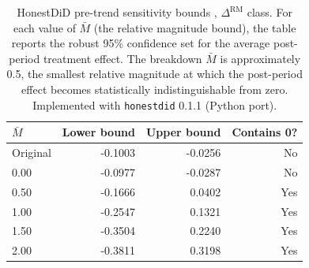 \begin{table}[ht]
\centering
\caption{HonestDiD pre-trend sensitivity bounds \citep{rambachan2023honest}, $\Delta^{\text{RM}}$ class. For each value of $\bar{M}$ (the relative magnitude bound), the table reports the robust 95\% confidence set for the average post-period treatment effect. The breakdown $\bar{M}$ is approximately 0.5, the smallest relative magnitude at which the post-period effect becomes statistically indistinguishable from zero. Implemented with \texttt{honestdid} 0.1.1 (Python port).}
\label{tab:honestdid_bounds}
\small \setlength{\tabcolsep}{6pt}
\begin{tabular}{lrrr}
\toprule
$\bar{M}$ & Lower bound & Upper bound & Contains 0? \\
\midrule
Original & -0.1003 & -0.0256 & No \\
0.00 & -0.0977 & -0.0287 & No \\
0.50 & -0.1666 & 0.0402 & Yes \\
1.00 & -0.2547 & 0.1321 & Yes \\
1.50 & -0.3504 & 0.2240 & Yes \\
2.00 & -0.3811 & 0.3198 & Yes \\
\bottomrule
\end{tabular}
\end{table}